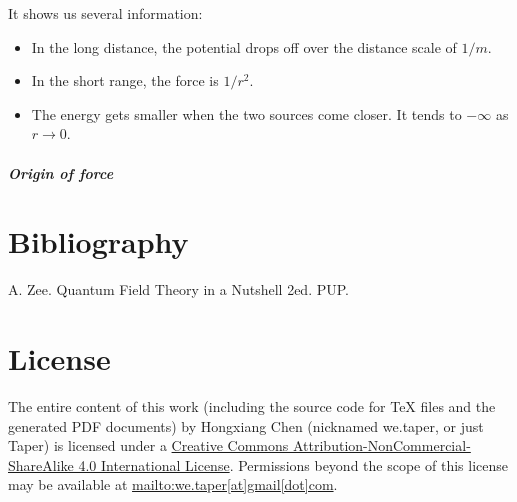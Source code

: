 \documentclass{book}
\numberwithin{equation}{subsection} %
\theoremstyle{definition}
\begin{document}
It shows us several information:
\begin{itemize}
    \item In the long distance, the potential drops off over the
        distance scale of $1/m$.
    \item In the short range, the force is $1/r^2$.
    \item The energy gets smaller when the two sources come closer.
        It tends to $-\infty$ as $r\to 0$.
\end{itemize}

\paragraph{Origin of force}
\chapter{Bibliography}
\begin{thebibliography}{1}
	 A. Zee. Quantum Field Theory in a Nutshell
		2ed. PUP.
\end{thebibliography}
\chapter{License}
The entire content of this work (including the source code
for TeX files and the generated PDF documents) by 
Hongxiang Chen (nicknamed we.taper, or just Taper) is
licensed under a 
\href{http://creativecommons.org/licenses/by-nc-sa/4.0/}{Creative 
	Commons Attribution-NonCommercial-ShareAlike 4.0 International 
	License}. Permissions beyond the scope of this 
license may be available at \url{mailto:we.taper[at]gmail[dot]com}.
\end{document}
